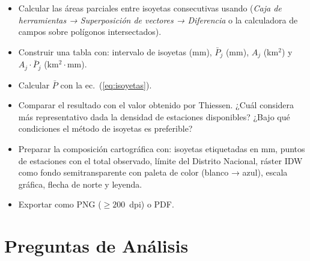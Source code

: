 \documentclass[11pt]{article}
\begin{document}
\begin{itemize}
  \item Calcular las áreas parciales entre isoyetas consecutivas usando
    \qgis{} (\emph{Caja de herramientas → Superposición de vectores →
    Diferencia} o la calculadora de campos sobre polígonos intersectados).

  \item Construir una tabla con: intervalo de isoyetas (mm),
    $\bar{P}_j$ (mm), $A_j$ (km$^2$) y $A_j \cdot \bar{P}_j$ (km$^2\cdot$mm).

  \item Calcular $\bar{P}$ con la ec.~(\ref{eq:isoyetas}).

  \item Comparar el resultado con el valor obtenido por Thiessen.
    ¿Cuál considera más representativo dada la densidad de estaciones disponibles?
    ¿Bajo qué condiciones el método de isoyetas es preferible?
\end{itemize}


\begin{itemize}
  \item Preparar la composición cartográfica con:
    isoyetas etiquetadas en mm,
    puntos de estaciones con el total observado,
    límite del Distrito Nacional,
    ráster IDW como fondo semitransparente con paleta de color (blanco → azul),
    escala gráfica, flecha de norte y leyenda.
  \item Exportar como PNG ($\geq 200$~dpi) o PDF.
\end{itemize}

\section*{Preguntas de Análisis}

\setcounter{pregunta}{0}


\end{document}
